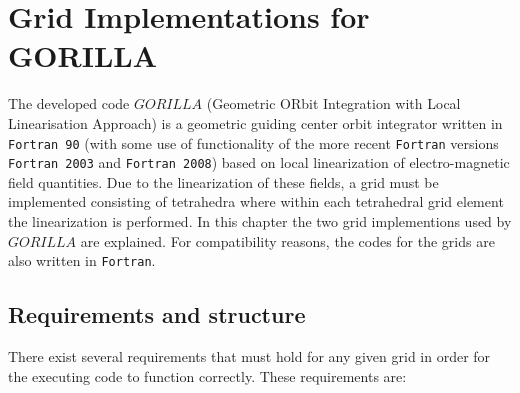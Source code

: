 \documentclass[./main.tex]{subfiles}
\begin{document}
\chapter{Grid Implementations for GORILLA}
\label{chap:GRID}
The developed code $GORILLA$ (Geometric ORbit Integration with Local Linearisation Approach) is a geometric guiding center orbit integrator written in \texttt{Fortran 90} (with some use of functionality of the more recent \texttt{Fortran} versions \texttt{Fortran 2003} and \texttt{Fortran 2008}) based on local linearization of electro-magnetic field quantities. Due to the linearization of these fields, a grid must be implemented consisting of tetrahedra where within each tetrahedral grid element the linearization is performed. In this chapter the two grid implementions used by $GORILLA$ are explained. For compatibility reasons, the codes for the grids are also written in \texttt{Fortran}. 

\section{Requirements and structure}

There exist several requirements that must hold for any given grid in order for the executing code to function correctly. These requirements are: 
\end{document}
